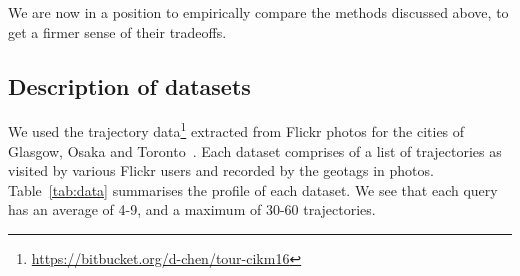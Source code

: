 
We are now in a position to empirically compare the methods discussed above,
to get a firmer sense of their tradeoffs.

%
\subsection{Description of datasets}

We used the trajectory data\footnote{\url{https://bitbucket.org/d-chen/tour-cikm16}}
extracted from Flickr photos for the cities of Glasgow, Osaka and
Toronto~\cite{ijcai15,cikm16paper}.
Each dataset comprises of a
list of trajectories as visited by various Flickr users and recorded by the geotags in photos.
Table~\ref{tab:data} summarises the profile of each dataset.
We see that %
each query has an average of 4-9, and a maximum of 30-60 trajectories.



